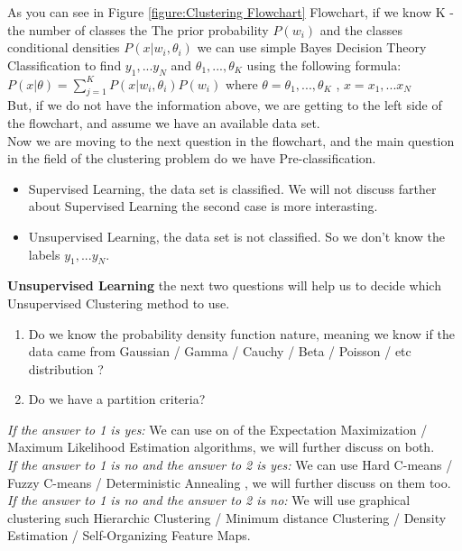 \documentclass[12pt, a4paper]{paper}
\begin{document}
As you can see in Figure \ref{figure:Clustering Flowchart} Flowchart, if we know K - the number of classes the The prior probability $P(w_{i})$ and the classes conditional densities $P(x|w_{i}, \theta_{i})$ we can use simple Bayes Decision Theory Classification to find $y_{1}, ... y_{N}$ and $\theta_{1} ,...,\theta_{K}$ using the following formula: \\
$P(x|\theta) = \sum_{j=1}^{K}{P(x|w_{i}, \theta_{i})P(w_{i})}$ where $\theta = \theta_{1} ,...,\theta_{K}$ , $x = x_{1}, ... x_{N}$ \\
But, if we do not have the information above, we are getting to the left side of the flowchart, and assume we have an available data set. \\  
Now we are moving to the next question in the flowchart, and the main question in the field of the clustering problem do we have Pre-classification. 
\begin{itemize}
    \item Supervised Learning, the data set is classified. We will not discuss farther about Supervised Learning the second case is more interasting. 
    \item Unsupervised Learning, the data set is not classified. So we don't know the labels $y_{1}, ... y_{N}$. 
\end{itemize}
\textbf{Unsupervised Learning} the next two questions will help us to decide which Unsupervised Clustering method to use.
\begin{enumerate}
    \item Do we know the probability density function nature, meaning we know if the data came from Gaussian / Gamma / Cauchy / Beta / Poisson / etc distribution ? 
    \item Do we have a partition criteria?
\end{enumerate} 
\textit{If the answer to 1 is yes:} We can use on of the Expectation Maximization / Maximum Likelihood Estimation algorithms, we will further discuss on both. \\
\textit{If the answer to 1 is no and the answer to 2 is yes:} We can use Hard C-means / Fuzzy C-means / Deterministic Annealing , we will further discuss on them too. \\
\textit{If the answer to 1 is no and the answer to 2 is no:} We will use graphical clustering such Hierarchic Clustering / Minimum distance Clustering / Density Estimation / Self-Organizing Feature Maps. 
\end{document}
